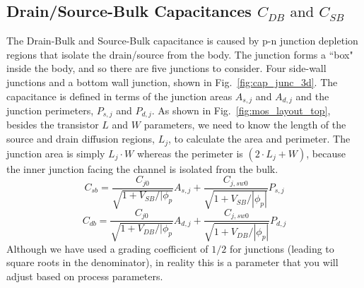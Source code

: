 \subsection{Drain/Source-Bulk Capacitances \texorpdfstring{$C_{DB}\text{ and }C_{SB}$}{}}
The Drain-Bulk and Source-Bulk capacitance is caused by p-n junction depletion regions that isolate the drain/source from the body. The junction forms a ``box" inside the body, and so there are five junctions to consider. Four side-wall junctions and a bottom wall junction, shown in Fig.~\ref{fig:cap_junc_3d}.  The capacitance is defined in terms of the junction areas $A_{s,j}$ and $A_{d,j}$ and the junction perimeters, $P_{s,j}$ and $P_{d,j}$.  As shown in  Fig.~\ref{fig:mos_layout_top}, besides the transistor $L$ and $W$ parameters, we need to know the length of the source and drain diffusion regions, $L_j$, to calculate the area and perimeter.  The junction area is simply $L_j \cdot W$ whereas the perimeter is $(2\cdot L_j + W)$, because the inner junction facing the channel is isolated from the bulk.
    \begin{equation}
        C_{sb} = \frac{C_{j0}}{\sqrt{ 1 + V_{SB}/|\phi_{p}}}  A_{s,j} + \frac{C_{j,sw0}}{\sqrt{ 1 + V_{SB}/|\phi_p|}} P_{s,j}
    \end{equation}
    \begin{equation}
        C_{db} = \frac{C_{j0}}{\sqrt{ 1 + V_{DB}/|\phi_{p}}}  A_{d,j} + \frac{C_{j,sw0}}{\sqrt{ 1 + V_{DB}/|\phi_p|}} P_{d,j}
    \end{equation}
Although we have used a grading coefficient of $1/2$ for junctions (leading to square roots in the denominator), in reality this is a parameter that you will adjust based on process parameters.

